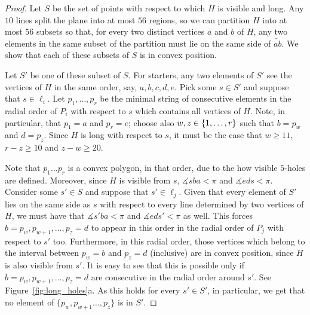 \documentclass[12pt,reqno, a4paper]{amsart}
\begin{document}
\begin{proof}
    Let $S$ be the set of points with respect to which $H$ is visible and long. Any $10$ lines split the plane into at most $56$ regions, so we can partition $H$ into at most $56$ subsets so that, for every two distinct vertices $a$ and $b$ of $H$, any two elements in the same subset of the partition must lie on the same side of $\overleftrightarrow{ab}$. We show that each of these subsets of $S$ is in convex position. 

    Let $S'$ be one of these subset of $S$. For starters, any two elements of $S'$ see the vertices of $H$ in the same order, say, $a,b,c,d,e$. Pick some $s\in S'$ and suppose that $s\in \ell_i$. Let $p_1,\dots,p_r$ be the minimal string of consecutive elements in the radial order of $P_i$ with respect to $s$ which contains all vertices of $H$. Note, in particular, that $p_1=a$ and $p_r=e$; choose also $w,z\in\mathbb \{1,\dots,r\}$ such that $b=p_w$ and $d=p_z$. Since $H$ is long with respect to $s$, it must be the case that $w\geq 11$, $r-z\geq 10$ and $z-w\geq 20$. 
    
    Note that $p_1\dots p_r$ is a convex polygon, in that order, due to the how visible $5$-holes are defined. Moreover, since $H$ is visible from $s$, $\measuredangle sba<\pi$ and $\measuredangle eds<\pi$. Consider some $s'\in S$ and suppose that $s'\in \ell_j$. Given that every element of $S'$ lies on the same side as $s$ with respect to every line determined by two vertices of $H$, we must have that $\measuredangle s'ba<\pi$ and $\measuredangle eds'<\pi$ as well. This forces $b=p_w,p_{w+1},\dots,p_z=d$ to appear in this order in the radial order of $P_j$ with respect to $s'$ too. Furthermore, in this radial order, those vertices which belong to the interval between $p_w=b$ and $p_z=d$ (inclusive) are in convex position, since $H$ is also visible from $s'$. It is easy to see that this is possible only if $b=p_w,p_{w+1},\dots,p_z=d$ are consecutive in the radial order around $s'$. See Figure~\ref{fig:long_holes}a. As this holds for every $s'\in S'$, in particular, we get that no element of $\{p_w,p_{w+1}\dots,p_z\}$ is in $S'$.


\end{proof}
\end{document}
